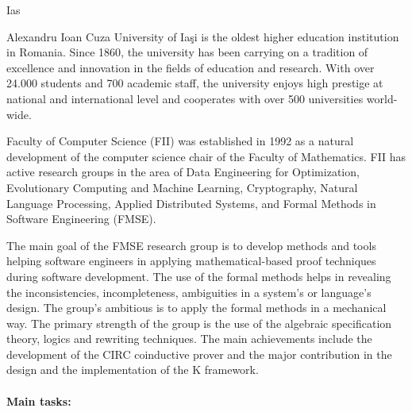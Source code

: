 \begin{sitedescription}{Ias}



Alexandru Ioan Cuza University of Iaşi is the oldest higher education institution in Romania. 
Since 1860, the university has been carrying on a tradition of excellence and innovation in 
the fields of education and research. With over 24.000 students and 700 academic staff, 
the university enjoys high prestige at national and international level and cooperates with  
over 500 universities world-wide. 

Faculty of Computer Science (FII) was established in 1992 as a natural development of the computer 
science chair of the Faculty of Mathematics. FII has active research groups in the area of 
Data Engineering for Optimization, Evolutionary Computing and Machine Learning, Cryptography,
Natural Language Processing, Applied Distributed Systems, and Formal Methods in Software Engineering (FMSE).

The main goal of the FMSE research group is to develop methods and tools helping software
engineers in applying mathematical-based proof techniques during software development.
The use of the formal methods helps in revealing the inconsistencies, incompleteness,
ambiguities in a system's or language's design. The group’s ambitious is to apply the formal
methods in a mechanical way. The primary strength of the group is the use of the algebraic
specification theory, logics and rewriting techniques. The main achievements include the
development of the CIRC coinductive prover and the major contribution in the design and the
implementation of the K framework.

\paragraph*{Main tasks:}


\end{sitedescription}
